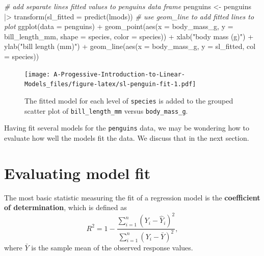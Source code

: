 \documentclass[
]{book}
\newenvironment{Shaded}{\begin{snugshade}}{\end{snugshade}}
\newcommand{\AttributeTok}[1]{\textcolor[rgb]{0.77,0.63,0.00}{#1}}
\newcommand{\CommentTok}[1]{\textcolor[rgb]{0.56,0.35,0.01}{\textit{#1}}}
\newcommand{\FunctionTok}[1]{\textcolor[rgb]{0.00,0.00,0.00}{#1}}
\newcommand{\NormalTok}[1]{#1}
\newcommand{\OtherTok}[1]{\textcolor[rgb]{0.56,0.35,0.01}{#1}}
\newcommand{\SpecialCharTok}[1]{\textcolor[rgb]{0.00,0.00,0.00}{#1}}
\newcommand{\StringTok}[1]{\textcolor[rgb]{0.31,0.60,0.02}{#1}}
\theoremstyle{definition}
\theoremstyle{definition}
\theoremstyle{definition}
\theoremstyle{definition}
\theoremstyle{remark}
\begin{document}
\begin{Shaded}
\begin{Highlighting}[]
\CommentTok{\# add separate lines fitted values to penguins data frame}
\NormalTok{penguins }\OtherTok{\textless{}{-}}
\NormalTok{  penguins }\SpecialCharTok{|\textgreater{}}
  \FunctionTok{transform}\NormalTok{(}\AttributeTok{sl\_fitted =} \FunctionTok{predict}\NormalTok{(lmods))}
\CommentTok{\# use geom\_line to add fitted lines to plot}
\FunctionTok{ggplot}\NormalTok{(}\AttributeTok{data =}\NormalTok{ penguins) }\SpecialCharTok{+}
  \FunctionTok{geom\_point}\NormalTok{(}\FunctionTok{aes}\NormalTok{(}\AttributeTok{x =}\NormalTok{ body\_mass\_g, }\AttributeTok{y =}\NormalTok{ bill\_length\_mm, }\AttributeTok{shape =}\NormalTok{ species, }\AttributeTok{color =}\NormalTok{ species)) }\SpecialCharTok{+}
  \FunctionTok{xlab}\NormalTok{(}\StringTok{"body mass (g)"}\NormalTok{) }\SpecialCharTok{+} \FunctionTok{ylab}\NormalTok{(}\StringTok{"bill length (mm)"}\NormalTok{) }\SpecialCharTok{+}
  \FunctionTok{geom\_line}\NormalTok{(}\FunctionTok{aes}\NormalTok{(}\AttributeTok{x =}\NormalTok{ body\_mass\_g, }\AttributeTok{y =}\NormalTok{ sl\_fitted, }\AttributeTok{col =}\NormalTok{ species))}
\end{Highlighting}
\end{Shaded}

\begin{figure}
\centering
\texttt{[image: A-Progessive-Introduction-to-Linear-Models\_files/figure-latex/sl-penguin-fit-1.pdf]}
\caption{\label{fig:sl-penguin-fit}The fitted model for each level of \texttt{species} is added to the grouped scatter plot of \texttt{bill\_length\_mm} versus \texttt{body\_mass\_g}.}
\end{figure}

Having fit several models for the \texttt{penguins} data, we may be wondering how to evaluate how well the models fit the data. We discuss that in the next section.

\hypertarget{evaluating-model-fit}{%
\section{Evaluating model fit}\label{evaluating-model-fit}}

The most basic statistic measuring the fit of a regression model is the \textbf{coefficient of determination}, which is defined as
\[
R^2 = 1 - \frac{\sum_{i=1}^n (Y_i-\hat{Y}_i)^2}{\sum_{i=1}^n (Y_i-\bar{Y})^2},\label{eq:rsquared}
\]
where \(\bar{Y}\) is the sample mean of the observed response values.
\end{document}

